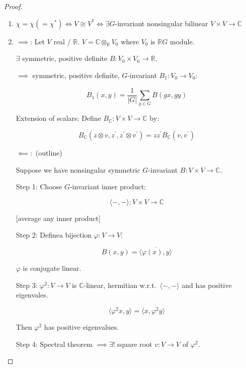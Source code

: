 \documentclass{article}
\theoremstyle{definition}
\begin{document}
\begin{proof}
    \begin{enumerate}[label=\roman*)]
        \item \(\chi = \overline{\chi} (=\chi^{\ast}) \iff V \cong V^{\ast} \iff \exists G\)-invariant nonsingular bilinear \(V \times V \to \mathbb{C}\) 
        \item \(\implies\): Let \(V\) real / \(\mathbb{R}\).
        \(V = \mathbb{C} \otimes_\mathbb{R} V_0\) where \(V_0\) is \(\mathbb{R} G\) module.

        \(\exists\) symmetric, positive definite \(B: V_0 \times V_0 \to \mathbb{R}\).
        
        \(\implies\) symmetric, positive definite, \(G\)-invariant \(B_1: V_0 \to V_0\):

        \[
            B_1(x,y) = \frac{1}{\vert G \vert} \sum_{g\in G} B(gx, gy) 
        \]

        Extension of scalars: Define \(B_\mathbb{C}: V \times V \to \mathbb{C}\) by:

        \[
            B_\mathbb{C} (z \otimes v, z^{\prime}, z^{\prime} \otimes v^{\prime}) = z z^{\prime} B_\mathbb{C} (v, v^{\prime})
        \]

        \(\impliedby:\) (outline)

        Suppose we have nonsingular symmetric \(G\)-invariant \(B: V \times V \to \mathbb{C}\).

        Step 1: Choose \(G\)-invariant inner product:

        \[
            \langle-,-\rangle : V \times V \to \mathbb{C}
        \]

        [average any inner product]

        Step 2: Definea bijection \(\varphi: V \to V\):

        \[
            B(x,y) = \overline{\langle \varphi(x), y \rangle } 
        \]

        \(\varphi\) is conjugate linear. 

        Step 3: \(\varphi^2: V \to V\) is \(\mathbb{C}\)-linear, hermitian w.r.t.\ \(\langle -,- \rangle \) and has positive eigenvales.
        
        \[
            \langle \varphi^2 x, y \rangle = \langle x, \varphi^2 y \rangle
        \]

        Then \(\varphi^2\) has positive eigenvalues.

        Step 4: Spectral theorem \(\implies \exists !\) square root \(v: V \to V\) of \(\varphi^2\).


\end{enumerate}
\end{proof}
\end{document}
